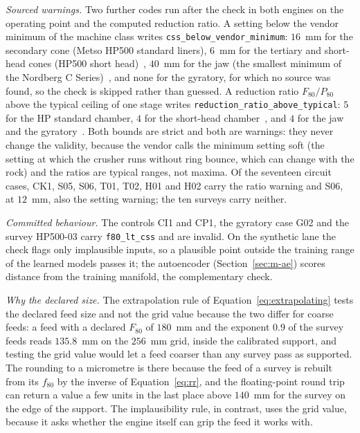 \emph{Sourced warnings.} Two further codes run after the check in both engines on the operating point and the computed reduction ratio. A setting
below the vendor minimum of the machine class writes \texttt{css\_below\_vendor\_minimum}: $16$~mm for the secondary cone (Metso HP500 standard
liners), $6$~mm for the tertiary and short-head cones (HP500 short head)~\cite{metsoHP}, $40$~mm for the jaw (the smallest minimum of the Nordberg
C Series)~\cite{metsoC}, and none for the gyratory, for which no source was found, so the check is skipped rather than guessed. A reduction ratio
$F_{80}/P_{80}$ above the typical ceiling of one stage writes \texttt{reduction\_ratio\_above\_typical}: $5$ for the HP standard chamber, $4$ for
the short-head chamber~\cite{metsoHP}, and $4$ for the jaw and the gyratory~\cite{metsoBasics}. Both bounds are strict and both are warnings: they
never change the validity, because the vendor calls the minimum setting soft (the setting at which the crusher runs without ring bounce, which can
change with the rock) and the ratios are typical ranges, not maxima. Of the seventeen circuit cases, CK1, S05, S06, T01, T02, H01 and H02 carry the
ratio warning and S06, at $12$~mm, also the setting warning; the ten surveys carry neither.

\emph{Committed behaviour.} The controls CI1 and CP1, the gyratory case G02 and the survey HP500-03 carry \texttt{f80\_lt\_css} and are invalid. On the
synthetic lane the check flags only implausible inputs, so a plausible point outside the training range of the learned models passes it; the
autoencoder (Section~\ref{sec:m-ae}) scores distance from the training manifold, the complementary check.

\emph{Why the declared size.} The extrapolation rule of Equation~\eqref{eq:extrapolating} tests the declared feed size and not the grid value
because the two differ for coarse feeds: a feed with a declared $F_{80}$ of $180$~mm and the exponent $0.9$ of the survey feeds reads $135.8$~mm on the $256$~mm grid, inside the
calibrated support, and testing the grid value would let a feed coarser than any survey pass as supported. The rounding to a micrometre is there
because the feed of a survey is rebuilt from its $f_{80}$ by the inverse of Equation~\eqref{eq:rr}, and the floating-point round trip can return
a value a few units in the last place above $140$~mm for the survey on the edge of the support. The implausibility rule, in contrast, uses the grid value, because it asks
whether the engine itself can grip the feed it works with.

